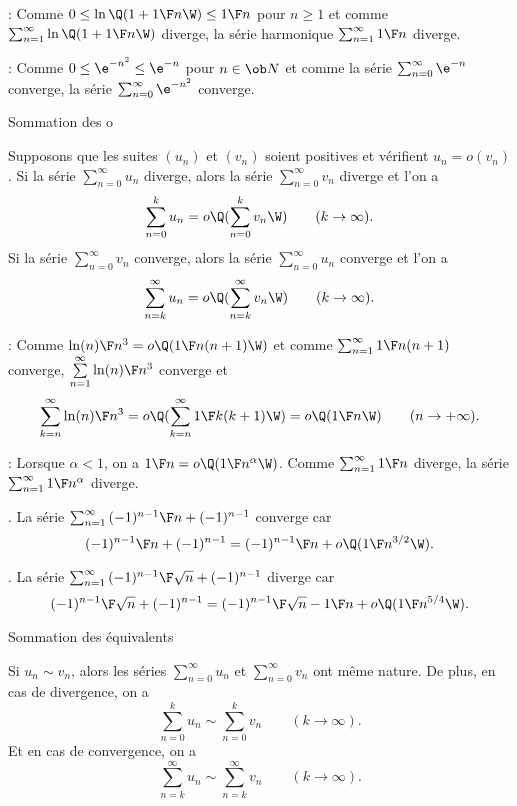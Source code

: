 \Application : Comme $0\le \ln\Q(1+{1\F n}\W)\le {1\F n}$ pour $n\ge1$ 
et comme $\sum_{n=1}^\infty\ln\Q(1+{1\F n}\W)$ diverge, la série harmonique 
$\sum_{n=1}^\infty{1\F n}$ diverge. 
\bigskip


\Application : Comme $0\le \e^{-n^2}\le \e^{-n}$ pour $n\in\ob N$ et comme la série $\sum_{n=0}^\infty\e^{-n}$ converge, 
la série $\sum_{n=0}^\infty\e^{-n^2}$ converge. 
\bigskip

\Concept Sommation des o

Supposons que les suites $(u_n)$ et $(v_n)$ soient positives et vérifient $u_n=o(v_n)$. \pn 
Si la série $\sum_{n=0}^\infty u_n$ diverge, alors la série $\sum_{n=0}^\infty v_n$ diverge et l'on a 
$$
\sum\limits_{n=0}^ku_n=o\Q(\sum\limits_{n=0}^kv_n\W)\qquad(k\to\infty). 
$$
Si la série $\sum_{n=0}^\infty v_n$ converge, alors la série $\sum_{n=0}^\infty u_n$ converge 
et l'on a 
$$
\sum\limits_{n=k}^\infty u_n=o\Q(\sum\limits_{n=k}^\infty v_n\W)\qquad(k\to\infty). 
$$ 

\Application : Comme ${\ln(n)\F n^3}=o\Q({1\F n(n+1)}\W)$ et comme $\sum_{n=1}^\infty{1\F n(n+1)}$ converge, 
$\sum\limits_{n=1}^\infty{\ln(n)\F n^3}$ converge et 
$$
\sum\limits_{k=n}^\infty{\ln(n)\F n^3}=o\Q(\sum\limits_{k=n}^\infty{1\F k(k+1)}\W)=o\Q({1\F n}\W)\qquad (n\to+\infty).
$$


\Application : Lorsque $\alpha<1$, on a ${1\F n}=o\Q({1\F n^\alpha}\W)$. Comme $\sum_{n=1}^\infty{1\F n}$ diverge, 
la série $\sum_{n=1}^\infty{1\F n^\alpha}$ diverge. 
\bigskip


\Exemple. La série $\sum_{n=1}^\infty{(-1)^{n-1}\F n+(-1)^{n-1}}$ converge car 
$$
{(-1)^{n-1}\F n+(-1)^{n-1}}={(-1)^{n-1}\F n}+o\Q(1\F n^{3/2}\W). 
$$

\Exemple. La série $\sum_{n=1}^\infty{(-1)^{n-1}\F\sqrt n+(-1)^{n-1}}$ diverge car 
$$
{(-1)^{n-1}\F\sqrt n+(-1)^{n-1}}={(-1)^{n-1}\F\sqrt n}-{1\F n}+o\Q({1\F n^{5/4}}\W). 
$$


\Concept Sommation des équivalents

Si $u_n\sim v_n$, alors les séries $\sum_{n=0}^\infty u_n$ et $\sum_{n=0}^\infty v_n$ ont même nature. \pn
De plus, en cas de divergence, on a 
$$
\sum\limits_{n=0}^ku_n\sim \sum\limits_{n=0}^kv_n\qquad(k\to\infty). 
$$
Et en cas de convergence, on a 
$$
\sum\limits_{n=k}^\infty u_n\sim \sum\limits_{n=k}^\infty v_n\qquad(k\to\infty). 
$$

